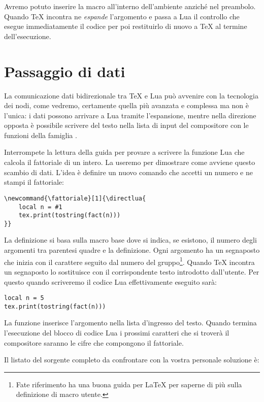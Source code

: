 Avremo potuto inserire la macro all'interno dell'ambiente  anziché
nel preambolo. Quando \TeX{} incontra  ne \emph{espande}
l'argomento e passa a Lua il controllo che esegue immediatamente il codice per
poi restituirlo di nuovo a \TeX{} al termine dell'esecuzione.


\section{Passaggio di dati}

La comunicazione dati bidirezionale tra \TeX{} e Lua può avvenire con la
tecnologia dei nodi, come vedremo, certamente quella più avanzata e complessa
ma non è l'unica: i dati possono arrivare a Lua tramite l'espansione, mentre
nella direzione opposta è possibile scrivere del testo nella lista di input
del compositore con le funzioni della famiglia .

Interrompete la lettura della guida per provare a scrivere la funzione Lua
 che calcola il fattoriale di un intero. La useremo per dimostrare come
avviene questo scambio di dati. L'idea è definire un nuovo comando che accetti
un numero e ne stampi il fattoriale:
\begin{Verbatim}
\newcommand{\fattoriale}[1]{\directlua{
    local n = #1
    tex.print(tostring(fact(n)))
}}
\end{Verbatim}

La definizione si basa sulla macro base  dove si indica, se
esistono, il numero degli argomenti tra parentesi quadre e la definizione. Ogni
argomento ha un segnaposto che inizia con il carattere \code{\#} seguito dal
numero del gruppo\footnote{Fate riferimento ha una buona guida per \LaTeX{} per
saperne di più sulla definizione di macro utente.}. Quando \TeX{} incontra un
segnaposto lo sostituisce con il corrispondente testo introdotto dall'utente.
Per questo quando scriveremo  il codice Lua
effettivamente eseguito sarà:
\begin{Verbatim}
local n = 5
tex.print(tostring(fact(n)))
\end{Verbatim}

La funzione  inserisce l'argomento nella lista d'ingresso del
testo. Quando termina l'esecuzione del blocco di codice Lua i prossimi caratteri
che si troverà il compositore saranno le cifre che compongono il fattoriale.

Il listato del sorgente completo da confrontare con la vostra personale
soluzione è:


